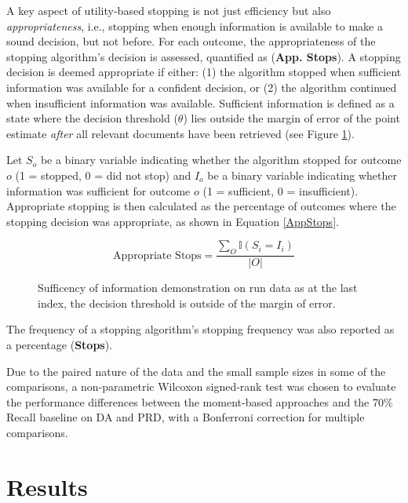 \documentclass[sigconf,natbib=true,anonymous=true]{acmart}
\begin{document}
A key aspect of utility-based stopping is not just efficiency but also \emph{appropriateness}, i.e., stopping when enough information is available to make a sound decision, but not before. For each outcome, the appropriateness of the stopping algorithm's decision is assessed, quantified as ({\bf{App. Stops}}). A stopping decision is deemed appropriate if either: (1) the algorithm stopped when sufficient information was available for a confident decision, or (2) the algorithm continued when insufficient information was available. Sufficient information is defined as a state where the decision threshold ($\theta$) lies outside the margin of error of the point estimate \emph{after} all relevant documents have been retrieved (see Figure \ref{fig:sufficient_information}). 

Let $S_o$ be a binary variable indicating whether the algorithm stopped for outcome $o$ (1 = stopped, 0 = did not stop) and $I_o$ be a  binary variable indicating whether information was sufficient for outcome $o$ (1 = sufficient, 0 = insufficient). Appropriate stopping is then calculated as the percentage of outcomes where the stopping decision was appropriate, as shown in Equation \ref{AppStops}.

\begin{equation}
\label{AppStops}
\text{Appropriate Stops} = \frac{\sum_{O} \mathbb{I}(S_i = I_i)}{|O|}
\end{equation}

\begin{figure}[b!]
    \centering
    
    \caption{Sufficency of information demonstration on run data as at the last index, the decision threshold is outside of the margin of error.}
    \label{fig:sufficient_information}
\end{figure}

The frequency of a stopping algorithm's stopping frequency was also reported as a percentage ({\bf Stops}).

Due to the paired nature of the data and the small sample sizes in some of the comparisons, a non-parametric Wilcoxon signed-rank test was chosen to evaluate the performance differences between the moment-based approaches and the 70\% Recall baseline on DA and PRD, with a Bonferroni correction for multiple comparisons.






\section{Results}
\end{document}
